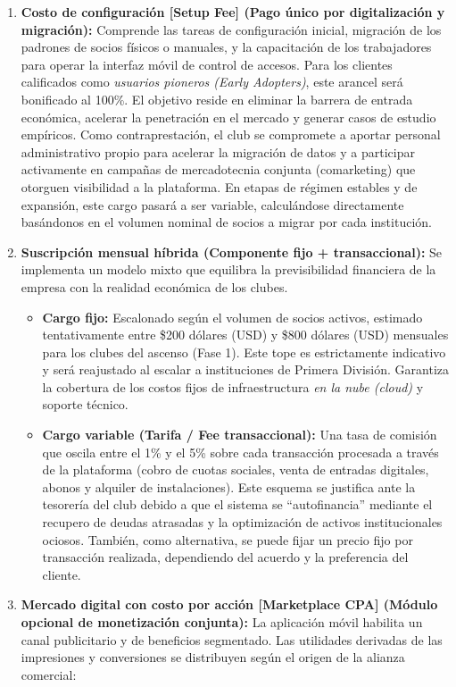 \begin{enumerate}
    \item \textbf{Costo de configuración [Setup Fee] (Pago único por digitalización y migración):} Comprende las tareas de configuración inicial, migración de los padrones de socios físicos o manuales, y la capacitación de los trabajadores para operar la interfaz móvil de control de accesos. Para los clientes calificados como \textit{usuarios pioneros (Early Adopters)}, este arancel será bonificado al 100\%. El objetivo reside en eliminar la barrera de entrada económica, acelerar la penetración en el mercado y generar casos de estudio empíricos. Como contraprestación, el club se compromete a aportar personal administrativo propio para acelerar la migración de datos y a participar activamente en campañas de mercadotecnia conjunta (comarketing) que otorguen visibilidad a la plataforma. En etapas de régimen estables y de expansión, este cargo pasará a ser variable, calculándose directamente basándonos en el volumen nominal de socios a migrar por cada institución.
    \item \textbf{Suscripción mensual híbrida (Componente fijo + transaccional):} Se implementa un modelo mixto que equilibra la previsibilidad financiera de la empresa con la realidad económica de los clubes.
    \begin{itemize}
        \item \textbf{Cargo fijo:} Escalonado según el volumen de socios activos, estimado tentativamente entre \$200 dólares (USD) y \$800 dólares (USD) mensuales para los clubes del ascenso (Fase 1). Este tope es estrictamente indicativo y será reajustado al escalar a instituciones de Primera División. Garantiza la cobertura de los costos fijos de infraestructura \textit{en la nube (cloud)} y soporte técnico.
        \item \textbf{Cargo variable (Tarifa / Fee transaccional):} Una tasa de comisión que oscila entre el 1\% y el 5\% sobre cada transacción procesada a través de la plataforma (cobro de cuotas sociales, venta de entradas digitales, abonos y alquiler de instalaciones). Este esquema se justifica ante la tesorería del club debido a que el sistema se ``autofinancia'' mediante el recupero de deudas atrasadas y la optimización de activos institucionales ociosos. También, como alternativa, se puede fijar un precio fijo por transacción realizada, dependiendo del acuerdo y la preferencia del cliente.
    \end{itemize}
    \item \textbf{Mercado digital con costo por acción [Marketplace CPA] (Módulo opcional de monetización conjunta):} La aplicación móvil habilita un canal publicitario y de beneficios segmentado. Las utilidades derivadas de las impresiones y conversiones se distribuyen según el origen de la alianza comercial:

\end{enumerate}
